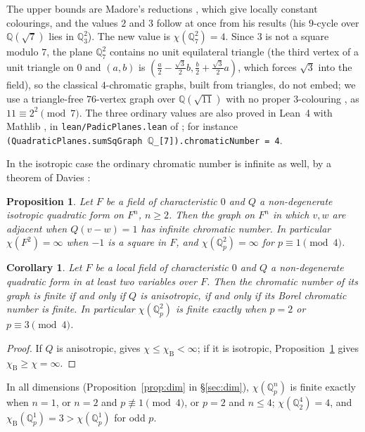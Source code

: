 \documentclass[11pt,a4paper]{amsart}
\newtheorem{corollary}[theorem]{Corollary}
\newtheorem{proposition}[theorem]{Proposition}
\theoremstyle{remark}
\newcommand{\Q}{\mathbb{Q}}
\newcommand{\chiB}{\chi_{\mathrm{B}}}
\begin{document}
The upper bounds are Madore's reductions \cite[Propositions~3.2 and 3.8]{Madore}, which give locally constant
colourings, and the values $2$ and $3$ follow at once from his results (his $9$-cycle over $\Q(\sqrt7)$
\cite[Proposition~4.3]{Madore} lies in $\Q_3^2$). The new value is $\chi(\Q_7^2)=4$. Since $3$ is not a square
modulo $7$, the plane $\Q_7^2$ contains no unit equilateral triangle (the third vertex of a unit triangle on
$0$ and $(a,b)$ is $(\frac a2-\frac{\sqrt3}2b,\frac b2+\frac{\sqrt3}2a)$, which forces $\sqrt3$ into the field),
so the classical $4$-chromatic graphs, built from triangles, do not embed; we use a triangle-free $76$-vertex graph
over $\Q(\sqrt{11})$ with no proper $3$-colouring \cite{QP}, as $11\equiv2^2\pmod7$. The three ordinary values are
also proved in Lean~4 with Mathlib \cite{Lean,mathlib}, in \texttt{lean/PadicPlanes.lean} of \cite{Repo}; for
instance \texttt{(QuadraticPlanes.sumSqGraph $\Q$\_[7]).chromaticNumber = 4}.

In the isotropic case the ordinary chromatic number is infinite as well, by a theorem of Davies \cite{Davies}:

\begin{proposition}\label{prop:C}
Let $F$ be a field of characteristic $0$ and $Q$ a non-degenerate isotropic quadratic form on $F^n$, $n\ge2$.
Then the graph on $F^n$ in which $v,w$ are adjacent when $Q(v-w)=1$ has infinite chromatic number. In particular
$\chi(F^2)=\infty$ when $-1$ is a square in $F$, and $\chi(\Q_p^2)=\infty$ for $p\equiv1\pmod4$.
\end{proposition}

\begin{corollary}\label{cor:dich}
Let $F$ be a local field of characteristic $0$ and $Q$ a non-degenerate quadratic form in at least two
variables over $F$. Then the chromatic number of its graph is finite if and only if $Q$ is anisotropic, if and
only if its Borel chromatic number is finite. In particular $\chi(\Q_p^2)$ is finite exactly when $p=2$ or
$p\equiv3\pmod4$.
\end{corollary}

\begin{proof}
If $Q$ is anisotropic, \cite[Theorem~1.1]{BMK} gives $\chi\le\chiB<\infty$; if it is isotropic,
Proposition~\ref{prop:C} gives $\chiB\ge\chi=\infty$.
\end{proof}

In all dimensions (Proposition~\ref{prop:dim} in \S\ref{sec:dim}), $\chi(\Q_p^n)$ is finite exactly when $n=1$, or
$n=2$ and $p\not\equiv1\pmod4$, or $p=2$ and $n\le4$; $\chi(\Q_2^4)=4$, and $\chiB(\Q_p^1)=3>\chi(\Q_p^1)$ for odd $p$.
\end{document}
